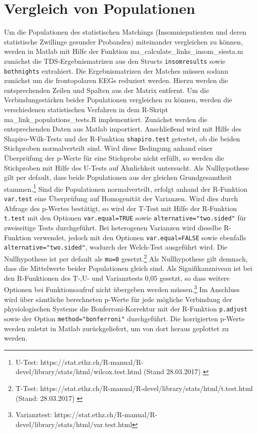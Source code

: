 \section{Vergleich von Populationen}
Um die Populationen des statistischen Matchings (Insomniepatienten und deren statistische Zwillinge gesunder Probanden) miteinander vergleichen zu können, werden in Matlab mit Hilfe der Funktion ma\_calculate\_links\_insom\_siesta.m zunächst die \acs{TDS}-Ergebnismatrizen aus den Structs \texttt{insomresults} sowie \texttt{bothnights} extrahiert. Die Ergebnismatrizen der Matches müssen sodann zunächst um die frontopolaren \acs{EEG}s reduziert werden. Hierzu werden die entsprechenden Zeilen und Spalten aus der Matrix entfernt. Um die Verbindungsstärken beider Populationen vergleichen zu können, werden die verschiedenen statistischen Verfahren in dem R-Skript ma\_link\_populations\_tests.R implementiert. Zunächst werden die entsprechenden Daten aus Matlab importiert. Anschließend wird mit Hilfe des Shapiro-Wilk-Tests und der R-Funktion \texttt{shapiro.test} getestet, ob die beiden Stichproben normalverteilt sind. Wird diese Bedingung anhand einer Überprüfung der p-Werte für eine Stichprobe nicht erfüllt, so werden die Stichproben mit Hilfe des U-Tests auf Ähnlichkeit untersucht. Als Nullhypothese gilt per default, dass beide Populationen aus der gleichen Grundgesamtheit stammen.\footnote{U-Test: https://stat.ethz.ch/R-manual/R-devel/library/stats/html/wilcox.test.html (Stand 28.03.2017) \label{ftn:utest}} Sind die Populationen normalverteilt, erfolgt anhand der R-Funktion \texttt{var.test} eine Überprüfung auf Homogenität der Varianzen. Wird dies durch Abfrage des p-Wertes bestätigt, so wird der T-Test mit Hilfe der R-Funktion \texttt{t.test} mit den Optionen \texttt{var.equal=TRUE} sowie \texttt{alternative="two.sided"} für zweiseitige Tests durchgeführt. Bei heterogenen Varianzen wird dieselbe R-Funktion verwendet, jedoch mit den Optionen \texttt{var.equal=FALSE} sowie ebenfalls \texttt{alternative="two.sided"}, wodurch der Welch-Test ausgeführt wird. Die Nullhypothese ist per default als \texttt{mu=0} gesetzt.\footnote{T-Test: https://stat.ethz.ch/R-manual/R-devel/library/stats/html/t.test.html (Stand: 28.03.2017) \label{ftn:ttest}} Als Nullhypothese gilt demnach, dass die Mittelwerte beider Populationen gleich sind. Als Signifikanzniveau ist bei den R-Funktionen des T-,U- und Varianztests 0,05 gesetzt, so dass weitere Optionen bei Funktionsaufruf nicht übergeben werden müssen.\footnote{Varianztest: https://stat.ethz.ch/R-manual/R-devel/library/stats/html/var.test.html} Im Anschluss wird über sämtliche berechneten p-Werte für jede mögliche Verbindung der physiologischen Systeme die Bonferroni-Korrektur mit der R-Funktion \texttt{p.adjust} sowie der Option \texttt{method="bonferroni"} durchgeführt. Die korrigierten p-Werte werden zuletzt in Matlab zurückgeliefert, um von dort heraus geplottet zu werden.\\

